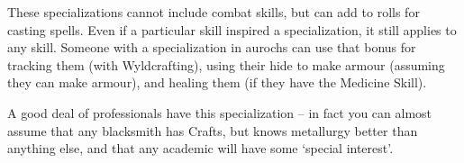 \begin{multicols}{2}
These specializations cannot include combat skills, but can add to rolls for casting spells.
Even if a particular skill inspired a specialization, it still applies to any skill.
Someone with a specialization in aurochs can use that bonus for tracking them (with Wyldcrafting), using their hide to make armour (assuming they can make armour), and healing them (if they have the Medicine Skill).

A good deal of professionals have this specialization -- in fact you can almost assume that any blacksmith has Crafts, but knows metallurgy better than anything else, and that any academic will have some `special interest'.

\end{multicols}
